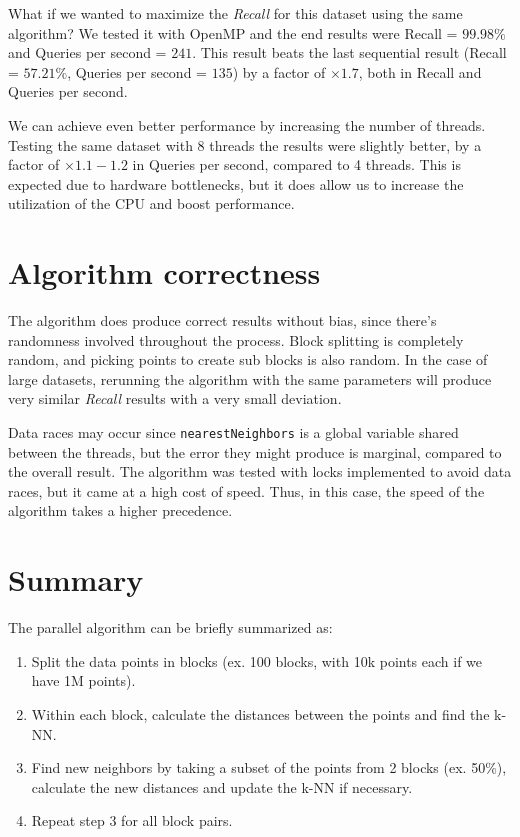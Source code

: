 \documentclass{article}
\begin{document}
What if we wanted to maximize the \emph{Recall} for this dataset using the same algorithm?
We tested it with OpenMP and the end results were Recall = $99.98\%$ and Queries per second = $241$.
This result beats the last sequential result (Recall = $57.21\%$, Queries per second = $135$) by a factor of $\times1.7$, 
both in Recall and Queries per second.

We can achieve even better performance by increasing the number of threads. Testing the same dataset with 8 threads the
results were slightly better, by a factor of $\times1.1-1.2$ in Queries per second, compared to 4 threads. This is expected due to hardware
bottlenecks, but it does allow us to increase the utilization of the CPU and boost performance.

\section{Algorithm correctness}
The algorithm does produce correct results without bias, since there's randomness involved throughout the process.
Block splitting is completely random, and picking points to create sub blocks is also random. In the case of large datasets, rerunning the
algorithm with the same parameters will produce very similar \emph{Recall} results with a very small deviation.

Data races may occur since \texttt{nearestNeighbors} is a global variable shared between the threads, but the error they might produce 
is marginal, compared to the overall result. The algorithm was tested with locks implemented to avoid data races, but it came at 
a high cost of speed. Thus, in this case, the speed of the algorithm takes a higher precedence.

\section{Summary}
The parallel algorithm can be briefly summarized as:

\begin{enumerate}
    \item Split the data points in blocks (ex. 100 blocks, with 10k points each if we have 1M points).
    \item Within each block, calculate the distances between the points and find the k-NN.
    \item Find new neighbors by taking a subset of the points from 2 blocks (ex. 50\%), calculate the new distances and update the k-NN if necessary.
    \item Repeat step 3 for all block pairs.
\end{enumerate}
\end{document}
